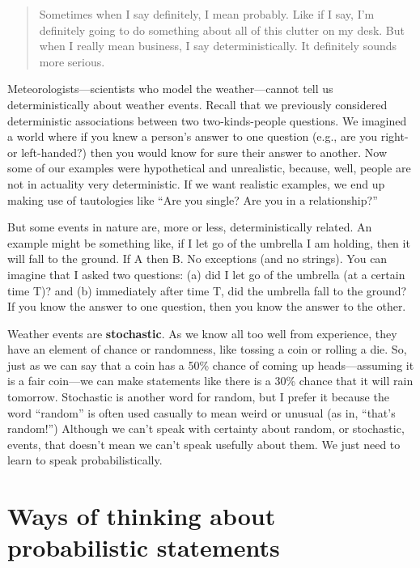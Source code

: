 \documentclass[openany]{book}
\begin{document}
\begin{quote}
Sometimes when I say definitely, I mean probably. Like if I say, I'm definitely going to do something about all of this clutter on my desk. But when I really mean business, I say deterministically. It definitely sounds more serious.
\end{quote}

Meteorologists---scientists who model the weather---cannot tell us deterministically about weather events. Recall that we previously considered deterministic associations between two two-kinds-people questions. We imagined a world where if you knew a person's answer to one question (e.g., are you right- or left-handed?) then you would know for sure their answer to another. Now some of our examples were hypothetical and unrealistic, because, well, people are not in actuality very deterministic. If we want realistic examples, we end up making use of tautologies like ``Are you single? Are you in a relationship?''

But some events in nature are, more or less, deterministically related. An example might be something like, if I let go of the umbrella I am holding, then it will fall to the ground. If A then B. No exceptions (and no strings). You can imagine that I asked two questions: (a) did I let go of the umbrella (at a certain time T)? and (b) immediately after time T, did the umbrella fall to the ground? If you know the answer to one question, then you know the answer to the other.

Weather events are \textbf{stochastic}. As we know all too well from experience, they have an element of chance or randomness, like tossing a coin or rolling a die. So, just as we can say that a coin has a 50\% chance of coming up heads---assuming it is a fair coin---we can make statements like there is a 30\% chance that it will rain tomorrow. Stochastic is another word for random, but I prefer it because the word ``random'' is often used casually to mean weird or unusual (as in, ``that's random!'') Although we can't speak with certainty about random, or stochastic, events, that doesn't mean we can't speak usefully about them. We just need to learn to speak probabilistically.

\hypertarget{ways-of-thinking-about-probabilistic-statements}{%
\section*{Ways of thinking about probabilistic statements}\label{ways-of-thinking-about-probabilistic-statements}}
\end{document}
